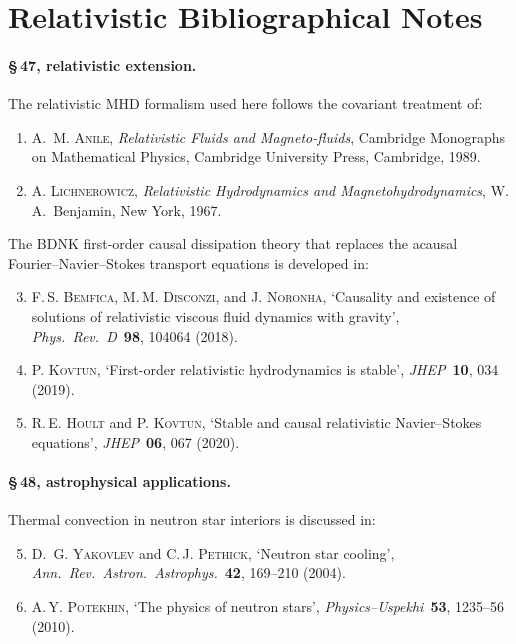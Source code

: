 \section*{Relativistic Bibliographical Notes}
\label{sec:rel-bib-47-48}

\paragraph{\S\,47, relativistic extension.}
The relativistic MHD formalism used here follows the covariant
treatment of:
\begin{enumerate}
\item A.~M. \textsc{Anile}, \emph{Relativistic Fluids and
  Magneto-fluids}, Cambridge Monographs on Mathematical Physics,
  Cambridge University Press, Cambridge, 1989.

\item A. \textsc{Lichnerowicz}, \emph{Relativistic Hydrodynamics and
  Magnetohydrodynamics}, W.\,A.\ Benjamin, New York, 1967.
\end{enumerate}

\noindent The BDNK first-order causal dissipation theory that replaces
the acausal Fourier--Navier--Stokes transport equations is developed in:
\begin{enumerate}
\setcounter{enumi}{2}
\item F.\,S. \textsc{Bemfica}, M.\,M. \textsc{Disconzi}, and
  J. \textsc{Noronha},
  `Causality and existence of solutions of relativistic viscous fluid
  dynamics with gravity',
  \emph{Phys.\ Rev.\ D}\ \textbf{98}, 104064 (2018).

\item P. \textsc{Kovtun},
  `First-order relativistic hydrodynamics is stable',
  \emph{JHEP}\ \textbf{10}, 034 (2019).

\item R.\,E. \textsc{Hoult} and P. \textsc{Kovtun},
  `Stable and causal relativistic Navier--Stokes equations',
  \emph{JHEP}\ \textbf{06}, 067 (2020).
\end{enumerate}

\paragraph{\S\,48, astrophysical applications.}
Thermal convection in neutron star interiors is discussed in:
\begin{enumerate}
\setcounter{enumi}{4}
\item D.~G. \textsc{Yakovlev} and C.\,J. \textsc{Pethick},
  `Neutron star cooling',
  \emph{Ann.\ Rev.\ Astron.\ Astrophys.}\ \textbf{42}, 169--210 (2004).

\item A.\,Y. \textsc{Potekhin}, `The physics of neutron stars',
  \emph{Physics--Uspekhi}\ \textbf{53}, 1235--56 (2010).
\end{enumerate}

